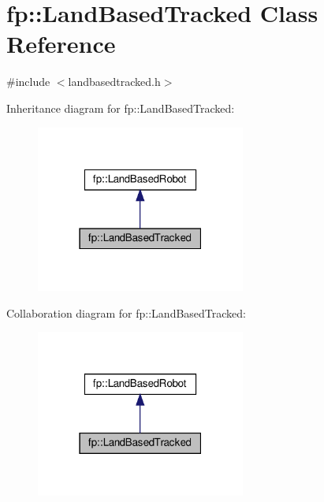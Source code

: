 \hypertarget{classfp_1_1_land_based_tracked}{}\section{fp\+:\+:Land\+Based\+Tracked Class Reference}
\label{classfp_1_1_land_based_tracked}


{\ttfamily \#include $<$landbasedtracked.\+h$>$}



Inheritance diagram for fp\+:\+:Land\+Based\+Tracked\+:\nopagebreak
\begin{figure}[H]
\begin{center}
\leavevmode
\includegraphics[width=195pt]{classfp_1_1_land_based_tracked__inherit__graph}
\end{center}
\end{figure}


Collaboration diagram for fp\+:\+:Land\+Based\+Tracked\+:\nopagebreak
\begin{figure}[H]
\begin{center}
\leavevmode
\includegraphics[width=195pt]{classfp_1_1_land_based_tracked__coll__graph}
\end{center}
\end{figure}
